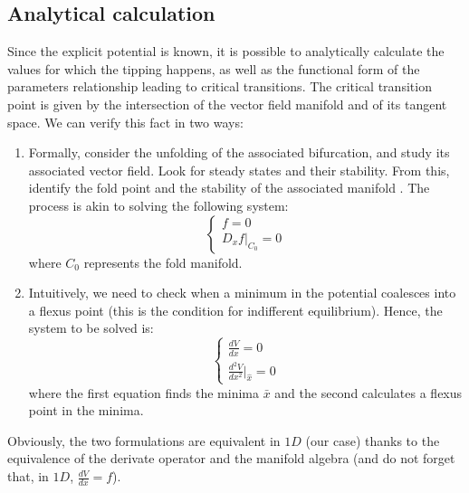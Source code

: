 \tocless\subsection{Analytical calculation}
Since the explicit potential is known, it is possible to analytically calculate the values for which the tipping happens, as well as the functional form of the parameters relationship leading to critical transitions.
The critical transition point is given by the intersection of the vector field manifold and of its tangent space. We can verify this fact in two ways:
\begin{enumerate}
	\item Formally, consider the unfolding of the associated bifurcation, and study its associated vector field. Look for steady states and their stability. From this, identify the fold point and the stability of the associated manifold \citep{kuehn2013mathematical}. The process is akin to solving the following system:
	\begin{equation}
		\begin{cases} f = 0 \\ D_x f|_{C_0} = 0 \end{cases} 
	\end{equation}
	where $C_0$ represents the fold manifold.
	
	\item Intuitively, we need to check when a minimum in the potential coalesces into a flexus point (this is the condition for indifferent equilibrium). Hence, the system to be solved is:
	\begin{equation}
		\begin{cases} \frac{dV}{dx} = 0 \\ \frac{d^2 V}{dx^2}|_{\hat{x}} = 0 \end{cases} 
		\label{solve}
	\end{equation}
	where the first equation finds the minima $\bar{x}$ and the second calculates a flexus point in the minima.
\end{enumerate}
Obviously, the two formulations are equivalent in $1D$ (our case) thanks to the equivalence of the derivate operator and the manifold algebra (and do not forget that, in $1D$, $\frac{dV}{dx}=f$).



